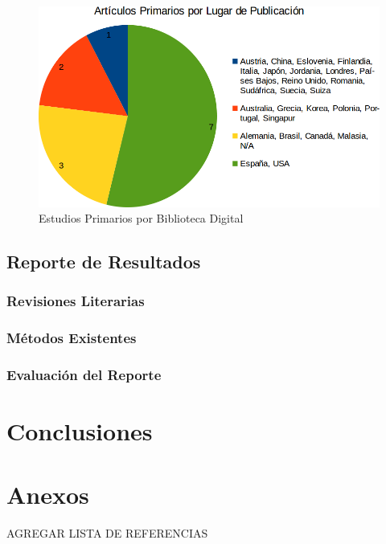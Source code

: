 \documentclass{report}
\begin{document}
            \begin{figure}[H]
        		\begin{center}
        			\includegraphics[scale=0.45]{images/1document/PrimariosLugar2.png}
        			\caption{Estudios Primarios por Biblioteca Digital}
		        	\label{primariosBiblioteca}
           		\end{center}
        	\end{figure}
	
	    \subsection{Reporte de Resultados}
	
    	    \subsubsection{Revisiones Literarias}    
    
            \subsubsection{Métodos Existentes}
        
            \subsubsection{Evaluación del Reporte}
        
    \section{Conclusiones}
    
    \newpage
    
    
    
    
    \section{Anexos}
    AGREGAR LISTA DE REFERENCIAS
    
\end{document}
